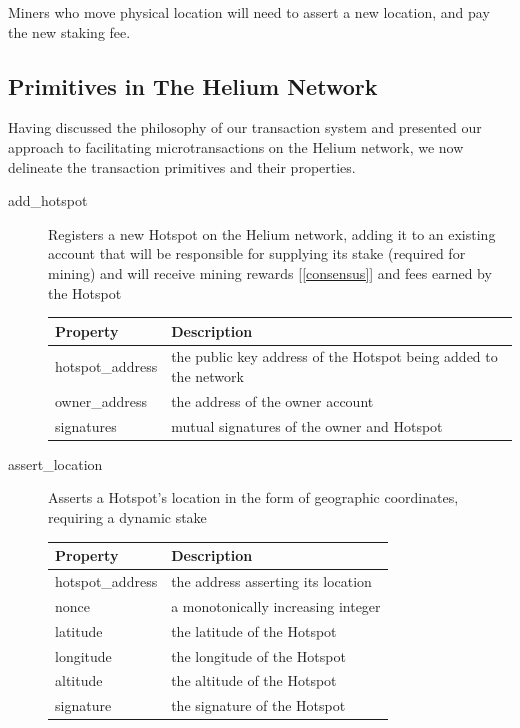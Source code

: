 \documentclass[10pt, nonatbib, nocopyrightspace, reprint]{sigplanconf}
\newcommand{\secref}[1]{[\autoref{#1}]}
\begin{document}
Miners who move physical location will need to assert a new location, and pay the new staking fee.

\subsection{Primitives in The Helium Network} \label{primitives}
Having discussed the philosophy of our transaction system and presented our approach to facilitating microtransactions on the Helium network, we now delineate the transaction primitives and their properties.

\begin{description}
  \item [add\_hotspot] Registers a new Hotspot on the Helium network, adding it to an existing account that will be responsible for supplying its stake (required for mining) and will receive mining rewards \secref{consensus} and fees earned by the Hotspot

\begin{table}[H]
  \centering
  \begin{tabularx}{\columnwidth}{l X}
    \toprule
    Property & Description \\ \midrule
    hotspot\_address & the public key address of the Hotspot being added to the network \\
    owner\_address & the address of the owner account \\
    signatures & mutual signatures of the owner and Hotspot
  \end{tabularx}
\end{table}

\item [assert\_location] Asserts a Hotspot's location in the form of geographic coordinates, requiring a dynamic stake

\begin{table}[H]
  \centering
  \begin{tabularx}{\columnwidth}{l X}
      \toprule
      Property & Description \\ \midrule
      hotspot\_address & the address asserting its location \\
      nonce & a monotonically increasing integer \\
      latitude & the latitude of the Hotspot \\
      longitude & the longitude of the Hotspot \\
      altitude & the altitude of the Hotspot \\
      signature & the signature of the Hotspot
  \end{tabularx}
\end{table}


\end{description}
\end{document}
